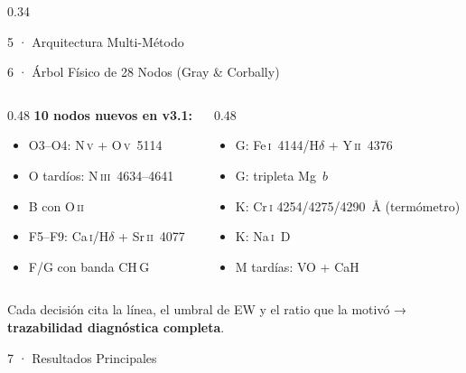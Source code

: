 \documentclass[final]{beamer}
\begin{document}
\begin{frame}[t]{}
\begin{columns}[t,totalwidth=\paperwidth]
\begin{column}{0.34\paperwidth}
\begin{block}{5 · Arquitectura Multi-Método}
  \end{block}

  \vspace{0.4cm}

  \begin{block}{6 · Árbol Físico de 28 Nodos (Gray \& Corbally)}
    \begin{columns}[t]
      \begin{column}{0.48\linewidth}
        \textbf{10 nodos nuevos en v3.1:}
        \begin{itemize}\setlength\itemsep{4pt}
          \item O3--O4: N\,\textsc{v} + O\,\textsc{v}~5114
          \item O tardíos: N\,\textsc{iii}~4634--4641
          \item B con O\,\textsc{ii}
          \item F5--F9: Ca\,\textsc{i}/H$\delta$ + Sr\,\textsc{ii}~4077
          \item F/G con banda CH\,G
        \end{itemize}
      \end{column}
      \begin{column}{0.48\linewidth}
        \begin{itemize}\setlength\itemsep{4pt}
          \item G: Fe\,\textsc{i}~4144/H$\delta$ + Y\,\textsc{ii}~4376
          \item G: tripleta Mg~$b$
          \item K: Cr\,\textsc{i} 4254/4275/4290~Å (termómetro)
          \item K: Na\,\textsc{i}~D
          \item M tardías: VO + CaH
        \end{itemize}
      \end{column}
    \end{columns}
    \vspace{0.3cm}
    Cada decisión cita la línea, el umbral de EW y el ratio que la motivó
    → \textbf{trazabilidad diagnóstica completa}.
  \end{block}

  \vspace{0.4cm}

  \begin{block}{7 · Resultados Principales}


\end{block}
\end{column}
\end{columns}
\end{frame}
\end{document}
